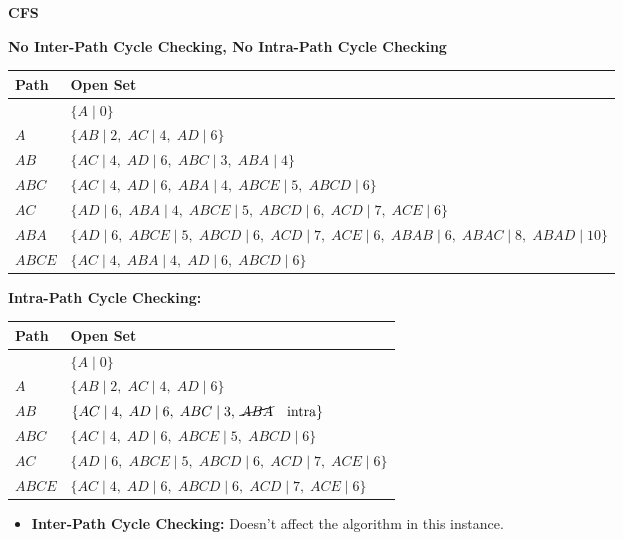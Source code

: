 \begin{example} \textbf{CFS}

    \textbf{No Inter-Path Cycle Checking, No Intra-Path Cycle Checking}
    \begin{center}
        \begin{tabular}{ll}
        \toprule
        \textbf{Path} & \textbf{Open Set} \\
        \midrule
         & $\{A \mid 0\}$ \\
        $A$ & $\{AB \mid 2, \; AC \mid 4, \; AD \mid 6\}$ \\
        $AB$ & $\{AC \mid 4, \; AD \mid 6, \; ABC \mid 3, \; ABA \mid 4\}$ \\
        $ABC$ & $\{AC \mid 4, \; AD \mid 6, \; ABA \mid 4, \; ABCE \mid 5, \; ABCD \mid 6\}$ \\
        $AC$ & $\{AD \mid 6, \; ABA \mid 4, \; ABCE \mid 5, \; ABCD \mid 6, \; ACD \mid 7, \; ACE \mid 6\}$ \\
        $ABA$ & $\{AD \mid 6, \; ABCE \mid 5, \; ABCD \mid 6, \; ACD \mid 7, \; ACE \mid 6, \; ABAB \mid 6, \; ABAC \mid 8, \; ABAD \mid 10\}$ \\
        $ABCE$ & $\{AC \mid 4, \; ABA \mid 4, \; AD \mid 6, \; ABCD \mid 6\}$ \\
        \bottomrule
        \end{tabular}
    \end{center}
    \vspace{1em}

    \textbf{Intra-Path Cycle Checking:}
    \begin{center}
        \begin{tabular}{ll}
        \toprule
        \textbf{Path} & \textbf{Open Set} \\
        \midrule
         & $\{A \mid 0\}$ \\
        $A$ & $\{AB \mid 2, \; AC \mid 4, \; AD \mid 6\}$ \\
        $AB$ & $\{AC \mid 4, \; AD \mid 6, \; ABC \mid 3, \; \cancel{ABA} \quad \text{intra} \}$ \\
        $ABC$ & $\{AC \mid 4, \; AD \mid 6, \; ABCE \mid 5, \; ABCD \mid 6\}$ \\
        $AC$ & $\{AD \mid 6, \; ABCE \mid 5, \; ABCD \mid 6, \; ACD \mid 7, \; ACE \mid 6\}$ \\
        $ABCE$ & $\{AC \mid 4, \; AD \mid 6, \; ABCD \mid 6, \; ACD \mid 7, \; ACE \mid 6\}$ \\
        \bottomrule
        \end{tabular}
    \end{center}
    \begin{itemize}
        \item \textbf{Inter-Path Cycle Checking:} Doesn't affect the algorithm in this instance.
    \end{itemize}

\end{example}

